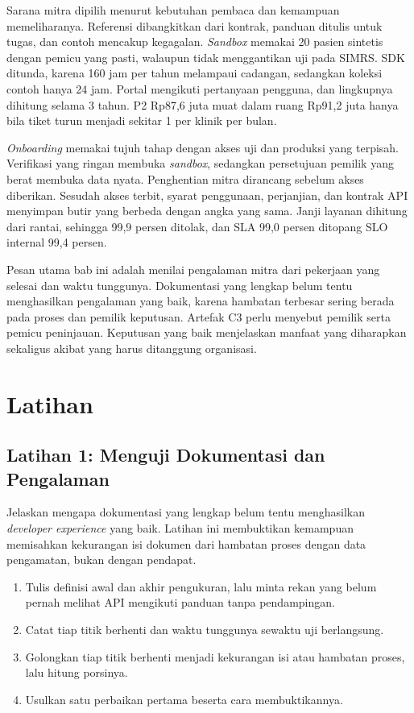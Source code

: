 Sarana mitra dipilih menurut kebutuhan pembaca dan kemampuan memeliharanya. Referensi dibangkitkan dari kontrak, panduan ditulis untuk tugas, dan contoh mencakup
kegagalan. \textit{Sandbox} memakai 20 pasien sintetis dengan pemicu yang pasti, walaupun tidak menggantikan uji pada SIMRS. SDK ditunda, karena 160 jam per tahun melampaui
cadangan, sedangkan koleksi contoh hanya 24 jam. Portal mengikuti pertanyaan pengguna, dan lingkupnya dihitung selama 3 tahun. P2 Rp87,6 juta muat dalam ruang Rp91,2 juta
hanya bila tiket turun menjadi sekitar 1 per klinik per bulan.

\textit{Onboarding} memakai tujuh tahap dengan akses uji dan produksi yang terpisah. Verifikasi yang ringan membuka \textit{sandbox}, sedangkan persetujuan pemilik yang
berat membuka data nyata. Penghentian mitra dirancang sebelum akses diberikan. Sesudah akses terbit, syarat penggunaan, perjanjian, dan kontrak API menyimpan butir yang
berbeda dengan angka yang sama. Janji layanan dihitung dari rantai, sehingga 99,9 persen ditolak, dan SLA 99,0 persen ditopang SLO internal 99,4 persen.

Pesan utama bab ini adalah menilai pengalaman mitra dari pekerjaan yang selesai dan waktu tunggunya. Dokumentasi yang lengkap belum tentu menghasilkan pengalaman yang
baik, karena hambatan terbesar sering berada pada proses dan pemilik keputusan. Artefak C3 perlu menyebut pemilik serta pemicu peninjauan. Keputusan yang baik menjelaskan
manfaat yang diharapkan sekaligus akibat yang harus ditanggung organisasi.

\section{Latihan}

\subsection*{Latihan 1: Menguji Dokumentasi dan Pengalaman}

Jelaskan mengapa dokumentasi yang lengkap belum tentu menghasilkan \textit{developer experience} yang baik. Latihan ini membuktikan kemampuan memisahkan kekurangan isi
dokumen dari hambatan proses dengan data pengamatan, bukan dengan pendapat.

\begin{enumerate}
  \item Tulis definisi awal dan akhir pengukuran, lalu minta rekan yang belum pernah melihat API mengikuti panduan tanpa pendampingan.
  \item Catat tiap titik berhenti dan waktu tunggunya sewaktu uji berlangsung.
  \item Golongkan tiap titik berhenti menjadi kekurangan isi atau hambatan proses, lalu hitung porsinya.
  \item Usulkan satu perbaikan pertama beserta cara membuktikannya.
\end{enumerate}

